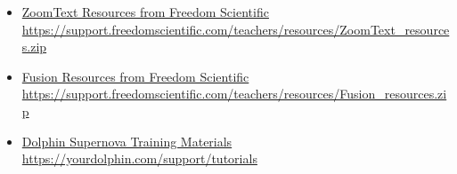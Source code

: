 {{\begin{itemize}[leftmargin=*]
\item \href{https://support.freedomscientific.com/teachers/resources/ZoomText_resources.zip}{ZoomText Resources from Freedom Scientific} \break\url{https://support.freedomscientific.com/teachers/resources/ZoomText_resources.zip}
\item \href{https://support.freedomscientific.com/teachers/resources/Fusion_resources.zip}{Fusion Resources from Freedom Scientific} \break\url{https://support.freedomscientific.com/teachers/resources/Fusion_resources.zip}
\item \href{https://yourdolphin.com/support/tutorials}{Dolphin Supernova Training Materials} \break\url{https://yourdolphin.com/support/tutorials}
\end{itemize}

}}
